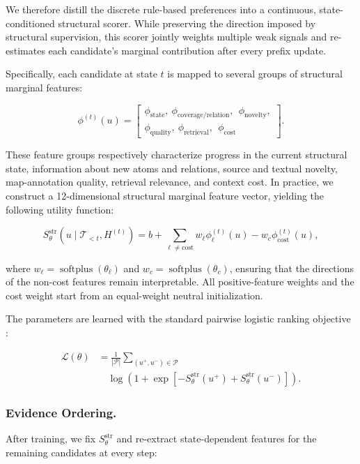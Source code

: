 \documentclass[letterpaper]{article}
\begin{document}
We therefore distill the discrete rule-based preferences into a continuous, state-conditioned structural scorer. While preserving the direction imposed by structural supervision, this scorer jointly weights multiple weak signals and re-estimates each candidate's marginal contribution after every prefix update.

Specifically, each candidate at state $t$ is mapped to several groups of structural marginal features:

\[
\phi^{(t)}(u)=\left[
\begin{gathered}
\phi_{\mathrm{state}},\ \phi_{\mathrm{coverage/relation}},\
\ \phi_{\mathrm{novelty}},\\
\phi_{\mathrm{quality}},\ \phi_{\mathrm{retrieval}},\
\ \phi_{\mathrm{cost}}
\end{gathered}
\right].
\]

These feature groups respectively characterize progress in the current structural state, information about new atoms and relations, source and textual novelty, map-annotation quality, retrieval relevance, and context cost. In practice, we construct a 12-dimensional structural marginal feature vector, yielding the following utility function:

\[
S_\theta^{\mathrm{str}}(u\mid\mathcal T_{<t},H^{(t)})
=b+\sum_{\ell\ne\mathrm{cost}}w_\ell\phi_\ell^{(t)}(u)
-w_c\phi_{\mathrm{cost}}^{(t)}(u),
\]

where $w_\ell=\operatorname{softplus}(\theta_\ell)$ and $w_c=\operatorname{softplus}(\theta_c)$, ensuring that the directions of the non-cost features remain interpretable. All positive-feature weights and the cost weight start from an equal-weight neutral initialization.

The parameters are learned with the standard pairwise logistic ranking objective \citep{Burges2005RankNet}:

\[
\begin{aligned}
\mathcal L(\theta)
&={}\frac{1}{|\mathcal P|}
\sum_{(u^+,u^-)\in\mathcal P}\\
&\quad\log\!\left(1+\exp\!\left[
-S_\theta^{\mathrm{str}}(u^+)+S_\theta^{\mathrm{str}}(u^-)
\right]\right).
\end{aligned}
\]

\subsubsection{Evidence Ordering.}

After training, we fix $S_\theta^{\mathrm{str}}$ and re-extract state-dependent features for the remaining candidates at every step:
\end{document}
